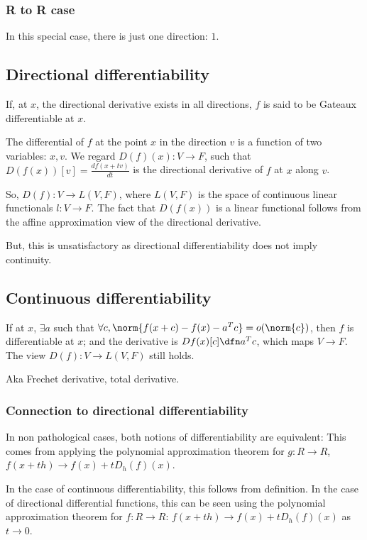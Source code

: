 \documentclass[oneside, article]{memoir}
\begin{document}
\subsubsection{R to R case}
In this special case, there is just one direction: $1$.

\subsection{Directional differentiability}
If, at $x$, the directional derivative exists in all directions, $f$ is said to be Gateaux differentiable at $x$.

The differential of $f$ at the point $x$ in the direction $v$ is a function of two variables: $x, v$. We regard $D(f)(x): V \to F$, such that $D(f(x))[v] = \frac{df(x + tv)}{dt}$ is the directional derivative of $f$ at $x$ along $v$.

So, $D(f): V \to L(V, F)$, where $L(V, F)$ is the space of continuous linear functionals $l:V \to F$. The fact that $D(f(x))$ is a linear functional follows from the affine approximation view of the directional derivative.

But, this is unsatisfactory as directional differentiability does not imply continuity. \why

\subsection{Continuous differentiability}
If at $x$, $\exists a$ such that $\forall c, \norm{f(x+c) - f(x) - a^{T}c} = o(\norm{c})$, then $f$ is differentiable at $x$; and the derivative is $Df(x)[c] \dfn a^{T}c$, which maps $V \to F$.  The view $D(f): V \to L(V, F)$ still holds.

Aka Frechet derivative, total derivative.

\subsubsection{Connection to directional differentiability}
In non pathological cases, both notions of differentiability are equivalent: This comes from applying the polynomial approximation theorem for $g: R \to R$, $f(x + th) \to f(x) + t D_h(f)(x)$.

In the case of continuous differentiability, this follows from definition. In the case of directional differential functions, this can be seen using the polynomial approximation theorem for $f:R \to R$: $f(x + th) \to f(x) + t D_h(f)(x)$ as $t \to 0$.
\end{document}
